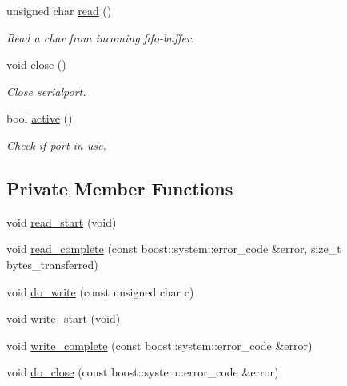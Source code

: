\begin{DoxyCompactItemize}
unsigned char \hyperlink{classCommunicator_a8592dcf1ef7cd278a3619a5735ff2b2b}{read} ()
\begin{DoxyCompactList}\small\item\em Read a char from incoming fifo-\/buffer. \end{DoxyCompactList}\item 
void \hyperlink{classCommunicator_a0e202fdfbc9ad191260b4da285d2f071}{close} ()
\begin{DoxyCompactList}\small\item\em Close serialport. \end{DoxyCompactList}\item 
bool \hyperlink{classCommunicator_a7aaa04bd32a78e8b5aa0d79b80b87e52}{active} ()
\begin{DoxyCompactList}\small\item\em Check if port in use. \end{DoxyCompactList}\end{DoxyCompactItemize}
\subsection*{Private Member Functions}
\begin{DoxyCompactItemize}
\item 
void \hyperlink{classCommunicator_af2d0f85b4fd75f457283448bec474d0e}{read\-\_\-start} (void)
\item 
void \hyperlink{classCommunicator_aacbd7b17b825522c324170422989b0dd}{read\-\_\-complete} (const boost\-::system\-::error\-\_\-code \&error, size\-\_\-t bytes\-\_\-transferred)
\item 
void \hyperlink{classCommunicator_af7dd39cc1a386cb9fb1a68715be7ae7a}{do\-\_\-write} (const unsigned char c)
\item 
void \hyperlink{classCommunicator_a949b951edc82d1b5174071b5204156eb}{write\-\_\-start} (void)
\item 
void \hyperlink{classCommunicator_a179b10517097859b289b9108ea2433b7}{write\-\_\-complete} (const boost\-::system\-::error\-\_\-code \&error)
\item 
void \hyperlink{classCommunicator_a39081affb66ee804daed1850faee4cdc}{do\-\_\-close} (const boost\-::system\-::error\-\_\-code \&error)
\end{DoxyCompactItemize}
